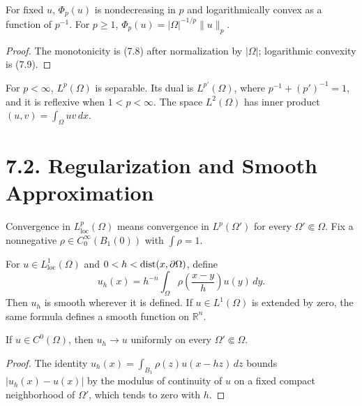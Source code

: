 \begin{proposition}
\label{gt:prop-sobolev-normalized-lp-functional}
For fixed $u$, $\Phi_p(u)$ is nondecreasing in $p$ and logarithmically convex
as a function of $p^{-1}$. For $p\geq1$,
$\Phi_p(u)=|\Omega|^{-1/p}\|u\|_p$.
\end{proposition}
\begin{proof}
\sketch The monotonicity is (7.8) after normalization by $|\Omega|$;
logarithmic convexity is (7.9).
\end{proof}

For $p<\infty$, $L^p(\Omega)$ is separable. Its dual is $L^{p'}(\Omega)$,
where $p^{-1}+(p')^{-1}=1$, and it is reflexive when $1<p<\infty$.
The space $L^2(\Omega)$ has inner product
$ (u,v)=\int_\Omega uv\,dx$.

\section*{7.2. Regularization and Smooth Approximation}

Convergence in $L^p_{\mathrm{loc}}(\Omega)$ means convergence in
$L^p(\Omega')$ for every $\Omega'\Subset\Omega$. Fix a nonnegative
$\rho\in C_0^\infty(B_1(0))$ with $\int\rho=1$.

\begin{definition}[Mollification]
\label{gt:def-sobolev-mollification}
For $u\in L^1_{\mathrm{loc}}(\Omega)$ and
$0<h<\operatorname{dist}(x,\partial\Omega)$, define
\begin{equation}
\tag{7.13}
u_h(x)=h^{-n}\int_\Omega
\rho\!\left(\frac{x-y}{h}\right)u(y)\,dy.
\end{equation}
Then $u_h$ is smooth wherever it is defined. If $u\in L^1(\Omega)$ is
extended by zero, the same formula defines a smooth function on $\mathbb R^n$.
\end{definition}

\begin{lemma}
\label{gt:lem-sobolev-regularization-uniform}
If $u\in C^0(\Omega)$, then $u_h\to u$ uniformly on every
$\Omega'\Subset\Omega$.
\end{lemma}
\begin{proof}
\sketch The identity
$u_h(x)=\int_{B_1}\rho(z)u(x-hz)\,dz$ bounds
$|u_h(x)-u(x)|$ by the modulus of continuity of $u$ on a fixed compact
neighborhood of $\Omega'$, which tends to zero with $h$.
\end{proof}

